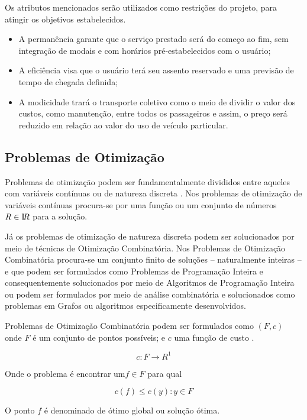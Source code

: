 Os atributos mencionados serão utilizados como restrições do projeto, para atingir os objetivos estabelecidos. 
\begin{itemize}
\item A permanência garante que o serviço prestado será do começo ao fim, sem integração de modais e com horários pré-estabelecidos com o usuário;
\item A eficiência visa que o usuário terá seu assento reservado e uma previsão de tempo de chegada definida;
\item A modicidade trará o transporte coletivo como o meio de dividir o valor dos custos, como manutenção, entre todos os passageiros e assim, o preço será reduzido em relação ao valor do uso de veículo particular.
\end{itemize}



\subsection{Problemas de Otimização}\label{problemas-de-otimizacao}

Problemas de otimização podem ser fundamentalmente divididos entre aqueles com variáveis contínuas ou de natureza discreta \cite{combinatorial-optimization}. Nos problemas de otimização de variáveis contínuas procura-se por uma função ou um conjunto de números \(R \in \textrm I\!R \) para a solução.

Já os problemas de otimização de natureza discreta podem ser solucionados por meio de técnicas de Otimização Combinatória. Nos Problemas de Otimização Combinatória procura-se um conjunto finito de soluções -- naturalmente inteiras -- e que podem ser formulados como Problemas de Programação Inteira e consequentemente solucionados por meio de Algoritmos de Programação Inteira \cite{goldbarg} ou podem ser formulados por meio de análise combinatória e solucionados como problemas em Grafos ou algoritmos especificamente desenvolvidos.


Problemas de Otimização Combinatória podem ser formulados como \((F, c)\) onde \(F\) é um conjunto de pontos possíveis; e \(c\) uma função de custo \cite{rodolfo}.

\[c: F \longrightarrow R^1 \]

Onde o problema é encontrar um\(f \in F\) para qual

\[c(f) \leq c(y): y \in F \]

O ponto \(f\) é denominado de ótimo global ou solução ótima.

